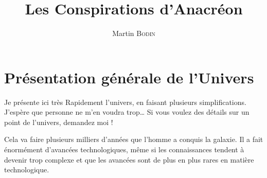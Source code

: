 \documentclass{article}
\title{Les Conspirations d’Anacréon}
\author{Martin \textsc{Bodin}}
\date{}
\begin{document}
\maketitle

\tableofcontents

\newpage

\newlength{\annee}
\settowidth{\annee}{Années 10 000}
\newlength{\texte}
\setlength{\texte}{\textwidth} \addtolength{\texte}{-\annee} 
	\addtolength{\texte}{-2\tabcolsep}

\section{Présentation générale de l’Univers}

Je présente ici très Rapidement l’univers, en faisant plusieurs simplifications.
J’espère que personne ne m’en voudra trop…
Si vous voulez des détails sur un point de l’univers, demandez moi !

Cela va faire plusieurs milliers d’années que l’homme a conquis la galaxie.
Il a fait énormément d’avancées technologiques, même si les connaissances tendent à devenir trop complexe et que les avancées sont de plus en plus rares en matière technologique.
\end{document}
